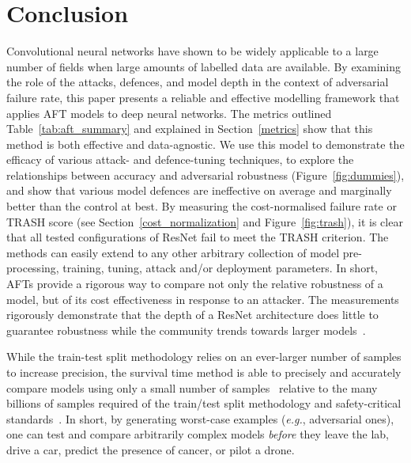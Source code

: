 \section{Conclusion}
Convolutional neural networks have shown to be widely applicable to a large number of fields when large amounts of labelled data are available.
By examining the role of the attacks, defences, and model depth in the context of adversarial failure rate, this paper presents a reliable and effective modelling framework that applies AFT models to deep neural networks.
The metrics outlined Table~\ref{tab:aft_summary} and explained in Section~\ref{metrics} show that this method is both effective and data-agnostic.  
We use this model to demonstrate the efficacy of various attack- and defence-tuning techniques, to  explore the relationships between accuracy and adversarial robustness (Figure~\ref{fig:dummies}), and show that various model defences are ineffective on average and marginally better than the control at best.
By measuring the cost-normalised failure rate or TRASH score (see Section~\ref{cost_normalization} and Figure~\ref{fig:trash}), it is clear that all tested configurations of ResNet fail to meet the TRASH criterion.
The methods can easily extend to any other arbitrary collection of model pre-processing, training, tuning, attack and/or deployment parameters. 
In short, AFTs provide a rigorous way to compare not only the relative robustness of a model, but of its cost effectiveness in response to an attacker.
The measurements rigorously demonstrate  that the depth of a ResNet architecture does little to guarantee robustness while the community trends towards larger models~\cite{desislavov2021compute}. 

While the train-test split methodology relies on an ever-larger number of samples to increase precision, the survival time method is able to precisely and accurately compare models using only a small number of samples~\cite{schmoor2000sample,lachin1981introduction} relative to the many billions of samples required of the train/test split methodology and safety-critical standards~\cite{iso26262,IEC61508,IEC62034,meyers}.
In short, by generating worst-case examples (\textit{e.g.}, adversarial ones), one can test and compare arbitrarily complex models \textit{before} they leave the lab, drive a car, predict the presence of cancer, or pilot a drone.
